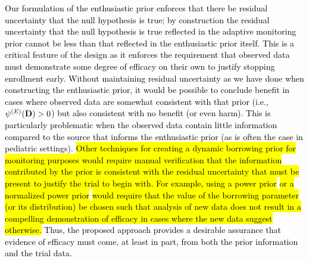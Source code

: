 \documentclass[12pt]{article}
\begin{document}
\textcolor{black}{Our formulation of the enthusiastic prior enforces that there be residual uncertainty that the null hypothesis is true; 
\textcolor{black}{by construction} the residual uncertainty that the null hypothesis is true reflected in the adaptive monitoring prior cannot be less than that reflected in the enthusiastic prior itself. This is a critical feature of the design as it enforces the requirement that observed data must demonstrate some degree of efficacy on their own to justify stopping enrollment early. Without maintaining residual uncertainty as we have done when constructing the enthusiastic prior, it would be possible to conclude benefit in cases where observed data are somewhat consistent with that prior (i.e., $\psi^{(E)}(\textcolor{black}{\mathbf{D}}) > 0$) but also consistent with no benefit (or even harm). This is particularly problematic when the observed data contain little information compared to the source that informs the enthusiastic prior (as is often the case in pediatric settings). \hl{Other techniques for creating a dynamic borrowing prior for monitoring purposes would require manual verification that the information contributed by the prior is consistent with the residual uncertainty that must be present to justify the trial to begin with. For example, using a power prior }\colorbox{yellow}{\citep{Ibrahim2000}}\hl{ or a normalized power prior }\colorbox{yellow}{\citep{Duan2006}}\hl{ would require that the value of the borrowing parameter (or its distribution) be chosen such that analysis of new data does not result in a compelling demonstration of efficacy in cases where the new data suggest otherwise.} Thus, the proposed approach provides a desirable assurance that evidence of efficacy must come, at least in part, from both the prior information and the trial data. 
}

\end{document}
